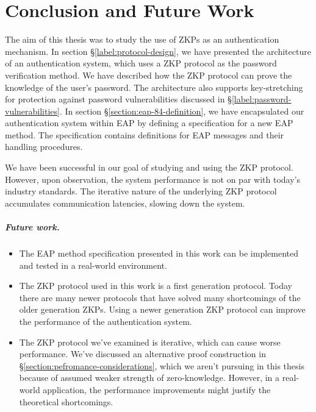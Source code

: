 \chapter{Conclusion and Future Work}
\thispagestyle{fancy}
\label{chapter:4}
The aim of this thesis was to study the use of ZKPs as an authentication mechanism.
In section \S\ref{label:protocol-design}, we have presented the architecture of an authentication system, which uses a ZKP protocol as the password verification method.
We have described how the ZKP protocol can prove the knowledge of the user's password. The architecture also supports key-stretching for protection against password vulnerabilities discussed in \S\ref{label:password-vulnerabilities}.
In section \S\ref{section:eap-84-definition}, we have encapsulated our authentication system within EAP by defining a specification for a new EAP method.
The specification contains definitions for EAP messages and their handling procedures.

We have been successful in our goal of studying and using the ZKP protocol.
However, upon observation, the system performance is not on par with today's industry standards. The iterative nature of the underlying ZKP protocol accumulates communication latencies, slowing down the system.

\paragraph{Future work.}

\begin{itemize}
	\item The EAP method specification presented in this work can be implemented and tested in a real-world environment.
	\item The ZKP protocol used in this work is a first generation protocol. Today there are many newer protocols that have solved many shortcomings of the older generation ZKPs. Using a newer generation ZKP protocol can improve the performance of the authentication system.
	\item The ZKP protocol we've examined is iterative, which can cause worse performance. We've discussed an alternative proof construction in \S\ref{section:pefromance-considerations}, which we aren't pursuing in this thesis because of assumed weaker strength of zero-knowledge. However, in a real-world application, the performance improvements might justify the theoretical shortcomings.
\end{itemize}